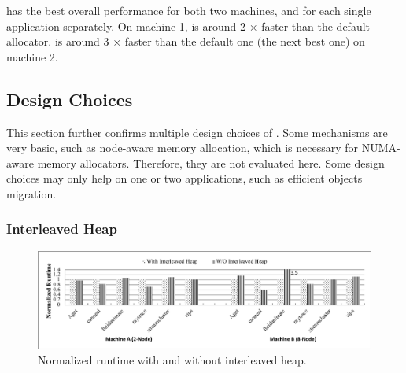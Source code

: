 \NM{} has the best overall performance for both two machines, and for each single application separately. On machine 1, \NM{} is around 2 $\times$ faster than the default allocator. \NM{} is around 3 $\times$ faster than the default one (the next best one) on machine 2.  

   
 

 

\subsection{Design Choices}
\label{sec:design}

This section further confirms multiple design choices of \NM{}. Some mechanisms are very basic, such as node-aware memory allocation, which is necessary for NUMA-aware memory allocators. Therefore, they are not evaluated here. Some design choices may only help on one or two applications, such as efficient objects migration.   

\subsubsection{Interleaved Heap} 
\label{sec:interleavedheap}

\begin{figure}[H]
    \centering
    \includegraphics[width=\textwidth]{figure/interleavedheap.pdf}
    \caption{Normalized runtime with and without interleaved heap.\label{fig:interleavedheap}}  
\end{figure}

